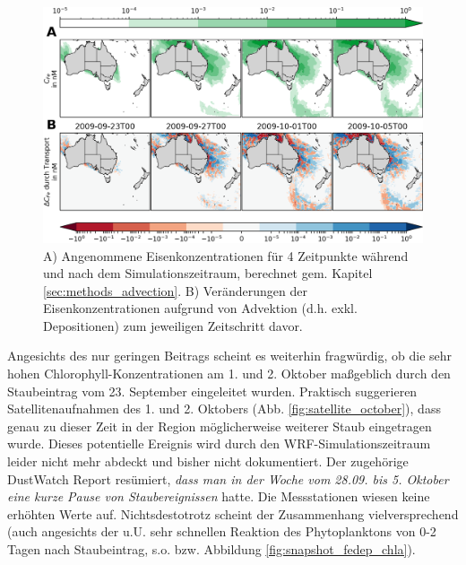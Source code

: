 \documentclass[12pt,a4paper,onecolumn,headheight=30pt]{scrartcl}
\begin{document}
\begin{figure}[htbp]
\includegraphics[width=\textwidth]{bilder/iron_transport.png}
\caption{A) Angenommene Eisenkonzentrationen für 4 Zeitpunkte während und nach dem Simulationszeitraum, berechnet gem. Kapitel \ref{sec:methods_advection}. B) Veränderungen der Eisenkonzentrationen aufgrund von Advektion (d.h. exkl. Depositionen) zum jeweiligen Zeitschritt davor.} \label{fig:iron_transport}
\end{figure}
Angesichts des nur geringen Beitrags scheint es weiterhin fragwürdig, ob die sehr hohen Chlorophyll-Konzentrationen am 1. und 2. Oktober maßgeblich durch den Staubeintrag vom 23. September eingeleitet wurden. Praktisch suggerieren Satellitenaufnahmen des 1. und 2. Oktobers (Abb. \ref{fig:satellite_october}), dass genau zu dieser Zeit in der Region möglicherweise weiterer Staub eingetragen wurde. Dieses potentielle Ereignis wird durch den WRF-Simulationszeitraum leider nicht mehr abdeckt und bisher nicht dokumentiert. Der zugehörige DustWatch Report \citep{Leys.2009b} resümiert, \textit{dass man in der Woche vom 28.09. bis 5. Oktober eine kurze Pause von Staubereignissen} hatte. Die Messstationen wiesen keine erhöhten Werte auf. Nichtsdestotrotz scheint der Zusammenhang vielversprechend (auch angesichts der u.U. sehr schnellen Reaktion des Phytoplanktons von 0-2 Tagen nach Staubeintrag, s.o. bzw. Abbildung \ref{fig:snapshot_fedep_chla}).
\end{document}
